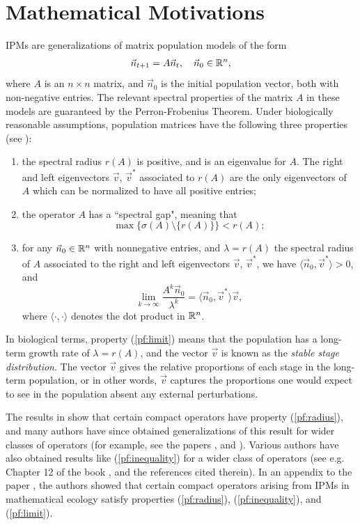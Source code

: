 \section{Mathematical Motivations} \label{section:mathematicalmotivations}

IPMs are generalizations of matrix population models of the form
\begin{align}
	\vec{n}_{t+1} = A \vec{n}_t, \quad \vec{n}_0 \in \mathbb{R}^n, \label{eqn:system}
\end{align}
where $A$ is an $n \times n$ matrix, and $\vec{n}_0$ is the initial population vector, both with non-negative entries. The relevant spectral properties of the matrix $A$ in these models are guaranteed by the Perron-Frobenius Theorem. Under biologically reasonable assumptions, population matrices have the following three properties (see \cite{Caswell2001}):
\begin{enumerate}
	\item \label{pf:radius} the spectral radius $r(A)$ is positive, and is an eigenvalue for $A$. The right and left eigenvectors $\vec{v}$, $\vec{v}^*$ associated to $r(A)$ are the only eigenvectors of $A$ which can be normalized to have all positive entries;
	\item \label{pf:inequality} the operator $A$ has a ``spectral gap", meaning that
	\[\max\{\sigma(A) \setminus \{r(A)\}\} < r(A);\]
	\item \label{pf:limit} for any $\vec{n}_0 \in \mathbb{R}^n$ with nonnegative entries, and $\lambda=r(A)$ the spectral radius of $A$ associated to the right and left eigenvectors $\vec{v}$, $\vec{v}^*$, we have $ \langle \vec{n}_0, \vec{v}^* \rangle > 0$, and 
	\[\lim_{k \to \infty} \frac{A^k \vec{n}_0}{\lambda^k} = \langle \vec{n}_0, \vec{v}^* \rangle \vec{v},\]
	where $\langle \cdot, \cdot \rangle$ denotes the dot product in $\mathbb{R}^n$.
\end{enumerate}

In biological terms, property (\ref{pf:limit}) means that the population has a long-term growth rate of $\lambda = r(A)$, and the vector $\vec{v}$ is known as the \emph{stable stage distribution}. The vector $\vec{v}$ gives the relative proportions of each stage in the long-term population, or in other words, $\vec{v}$ captures the proportions one would expect to see in the population absent any external perturbations.

The results in \cite{Krein1950} show that certain compact operators have property (\ref{pf:radius}), and many authors have since obtained generalizations of this result for wider classes of operators (for example, see the papers \cite{Anselone1974, Bonsall1958, Edmunds1972, Karlin1959, Kras1989, Lubben2009, Marek1967, Marek1970, Raghavan1965}, and \cite{Schaefer1960}). Various authors have also obtained results like (\ref{pf:inequality}) for a wider class of operators (see e.g. Chapter 12 of the book \cite{Kras1989}, and the references cited therein). In an appendix to the paper \cite{Ellner2006}, the authors showed that certain compact operators arising from IPMs in mathematical ecology satisfy properties (\ref{pf:radius}), (\ref{pf:inequality}), and (\ref{pf:limit}).

